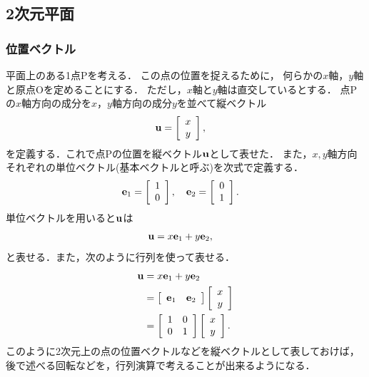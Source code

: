 \subsection{2次元平面}
%
\subsubsection{位置ベクトル}
%
平面上のある1点Pを考える．
この点の位置を捉えるために，
何らかの$x$軸，$y$軸と原点Oを定めることにする．
ただし，$x$軸と$y$軸は直交しているとする．
点Pの$x$軸方向の成分を$x$，$y$軸方向の成分$y$を並べて縦ベクトル
%
\begin{align}
{\bf u} & =\left[\begin{array}{c}
x\\
y
\end{array}\right], \label{LA:posvec} 
\end{align}
を定義する．これで点Pの位置を縦ベクトル${\bf u}$として表せた．
また，$x,y$軸方向それぞれの単位ベクトル(基本ベクトルと呼ぶ)を次式で定義する．
%
\begin{align}
{\bf e}_{1} & =\left[\begin{array}{c}
1\\
0
\end{array}\right],\quad{\bf e}_{2}=\left[\begin{array}{c}
0\\
1
\end{array}\right]. 
\end{align}
%
単位ベクトルを用いると${\bf u}$は
%
\begin{align}
{\bf u} & =x{\bf e}_{1}+y{\bf e}_{2}, \label{LA:uxe1ye2}
\end{align}
%
と表せる．また，次のように行列を使って表せる．
\begin{align}
{\bf u} & =x{\bf e}_{1}+y{\bf e}_{2}\notag\\
 & =\left[\begin{array}{cc}
{\bf e}_{1} & {\bf e}_{2}\end{array}\right]\left[\begin{array}{c}
x\\
y
\end{array}\right]\notag\\
 & = \left[\begin{array}{cc}
1 & 0\\
0 & 1
\end{array}\right]\left[\begin{array}{c}
x\\
y
\end{array}\right]. 
\end{align}
%
このように2次元上の点の位置ベクトルなどを縦ベクトルとして表しておけば，
後で述べる回転などを，行列演算で考えることが出来るようになる．
%
